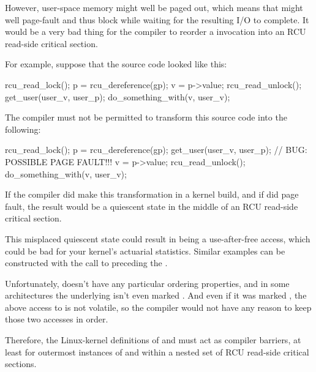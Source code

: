 However, user-space memory might well be paged out, which means that
 might well page-fault and thus block while waiting for the
resulting I/O to complete.
It would be a very bad thing for the compiler to
reorder a  invocation into an RCU read-side critical section.

For example, suppose that the source code looked like this:

\begin{VerbatimN}
	rcu_read_lock();
	p = rcu_dereference(gp);
	v = p->value;
	rcu_read_unlock();
	get_user(user_v, user_p);
	do_something_with(v, user_v);
\end{VerbatimN}

The compiler must not be permitted to transform this source code into
the following:

\begin{fcvlabel}
\begin{VerbatimN}[commandchars=\%\@\$]
	rcu_read_lock();
	p = rcu_dereference(gp);
	get_user(user_v, user_p); // BUG: POSSIBLE PAGE FAULT!!!
	v = p->value;     %
	rcu_read_unlock();
	do_something_with(v, user_v);
\end{VerbatimN}
\end{fcvlabel}

If the compiler did make this transformation in a  kernel
build, and if  did page fault, the result would be a quiescent
state in the middle of an RCU read-side critical section.
\begin{fcvref}
This misplaced
quiescent state could result in  %
being a use-after-free access,
which could be bad for your kernel's actuarial statistics.
Similar examples
can be constructed with the call to  preceding the
.
\end{fcvref}

Unfortunately,  doesn't have any particular ordering properties,
and in some architectures the underlying  isn't even marked
.
And even if it was marked , the above access to
 is not volatile, so the compiler would not have any reason to keep
those two accesses in order.

Therefore, the Linux-kernel definitions of  and
 must act as compiler barriers, at least for outermost
instances of  and  within a nested set
of RCU read-side critical sections.


